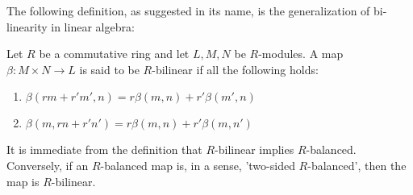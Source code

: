 The following definition, as suggested in its name, is the generalization of bi-linearity in linear algebra:
\begin{defn} [$R$-bilinear]
    Let $R$ be a commutative ring and let $L, M, N$ be $R$-modules. A map $\beta:M\times N\to L$ is said to be $R$-bilinear if all the following holds:
    \begin{enumerate}
        \item $\beta(rm+r'm', n) = r\beta(m,n) + r'\beta(m', n)$
        \item $\beta(m, rn+r'n') = r\beta(m,n) + r'\beta(m,n')$
    \end{enumerate}
\end{defn}
It is immediate from the definition that $R$-bilinear implies $R$-balanced. Conversely, if an $R$-balanced map is, in a sense, 'two-sided $R$-balanced', then the map is $R$-bilinear.

\medskip

